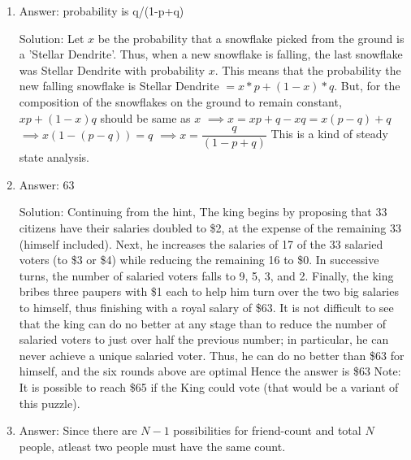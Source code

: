 \begin{enumerate}

\item
Answer: probability is q/(1-p+q)
 
Solution: Let $x$ be the probability that a snowflake picked from the ground is a 'Stellar Dendrite'. Thus, when a new snowflake is falling, the last snowflake was Stellar Dendrite with probability $x$.
This means that the probability the new falling snowflake is Stellar Dendrite $= x*p + (1-x)*q$. But, for the composition of the snowflakes on the ground to remain constant, $xp+(1-x)q$ should be same as $x$
$\implies x = xp + q - xq = x(p-q) + q $
$\implies x (1- (p-q)) = q $
$\implies x = \dfrac{q}{ (1- p + q)} $
This is a kind of steady state analysis.




\item
Answer: 63
 
Solution: Continuing from the hint, The king begins by proposing that 33 citizens have their salaries doubled to \$2, at the expense of the remaining 33 (himself included). Next, he increases the salaries of 17 of the 33 salaried voters (to \$3 or \$4) while reducing the remaining 16 to \$0. In successive turns, the number of salaried voters falls to 9, 5, 3, and 2. Finally, the king bribes three paupers with \$1 each to help him turn over the two big salaries to himself, thus finishing with a royal salary of \$63. It is not difficult to see that the king can do no better at any stage than to reduce the number of salaried voters to just over half the previous number; in particular, he can never achieve a unique salaried voter. Thus, he can do no better than \$63 for himself, and the six rounds above are optimal
Hence the answer is \$63
Note: It is possible to reach \$65 if the King could vote (that would be a variant of this puzzle).




\item
Answer: Since there are $N-1$ possibilities for friend-count and total $N$ people, atleast two people must have the same count.
 

\end{enumerate}
